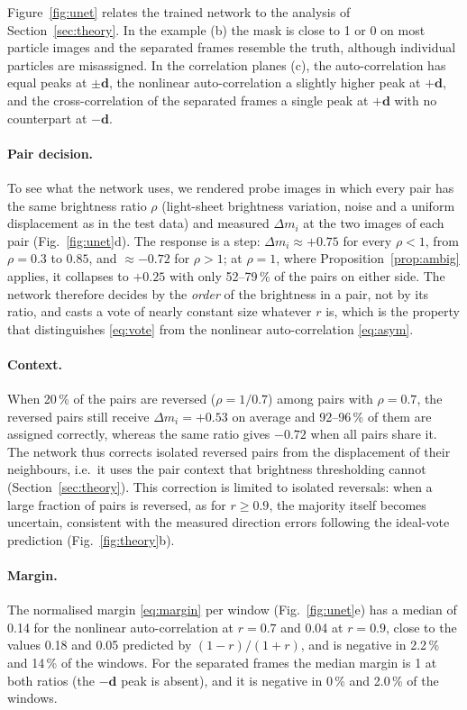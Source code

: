 \documentclass[11pt]{article}
\theoremstyle{remark}
\newcommand{\dd}{\mathbf{d}}
\begin{document}
Figure~\ref{fig:unet} relates the trained network to the analysis of Section~\ref{sec:theory}.
In the example (b) the mask is close to 1 or 0 on most particle images and the separated frames resemble the truth, although individual particles are misassigned.
In the correlation planes (c), the auto-correlation has equal peaks at $\pm\dd$, the nonlinear auto-correlation a slightly higher peak at $+\dd$, and the cross-correlation of the separated frames a single peak at $+\dd$ with no counterpart at $-\dd$.

\paragraph{Pair decision.}
To see what the network uses, we rendered probe images in which every pair has the same brightness ratio $\rho$ (light-sheet brightness variation, noise and a uniform displacement as in the test data) and measured $\Delta m_i$ at the two images of each pair (Fig.~\ref{fig:unet}d).
The response is a step: $\Delta m_i\approx+0.75$ for every $\rho<1$, from $\rho=0.3$ to $0.85$, and $\approx-0.72$ for $\rho>1$; at $\rho=1$, where Proposition~\ref{prop:ambig} applies, it collapses to $+0.25$ with only 52--79\,\% of the pairs on either side.
The network therefore decides by the \emph{order} of the brightness in a pair, not by its ratio, and casts a vote of nearly constant size whatever $r$ is, which is the property that distinguishes \eqref{eq:vote} from the nonlinear auto-correlation \eqref{eq:asym}.

\paragraph{Context.}
When 20\,\% of the pairs are reversed ($\rho=1/0.7$) among pairs with $\rho=0.7$, the reversed pairs still receive $\Delta m_i=+0.53$ on average and 92--96\,\% of them are assigned correctly, whereas the same ratio gives $-0.72$ when all pairs share it.
The network thus corrects isolated reversed pairs from the displacement of their neighbours, i.e.\ it uses the pair context that brightness thresholding cannot (Section~\ref{sec:theory}).
This correction is limited to isolated reversals: when a large fraction of pairs is reversed, as for $r\ge0.9$, the majority itself becomes uncertain, consistent with the measured direction errors following the ideal-vote prediction (Fig.~\ref{fig:theory}b).

\paragraph{Margin.}
The normalised margin \eqref{eq:margin} per window (Fig.~\ref{fig:unet}e) has a median of 0.14 for the nonlinear auto-correlation at $r=0.7$ and 0.04 at $r=0.9$, close to the values 0.18 and 0.05 predicted by $(1-r)/(1+r)$, and is negative in 2.2\,\% and 14\,\% of the windows. For the separated frames the median margin is 1 at both ratios (the $-\dd$ peak is absent), and it is negative in 0\,\% and 2.0\,\% of the windows.
\end{document}
